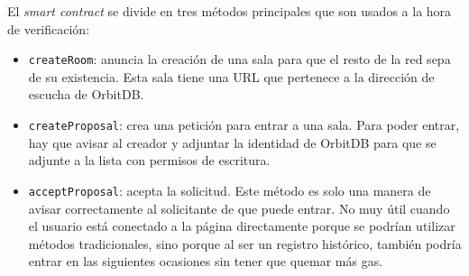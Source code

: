 El \textit{smart contract} se divide en tres métodos principales que son usados a la hora de verificación:
\begin{itemize}
    \item \verb|createRoom|: anuncia la creación de una sala para que el resto de la red sepa de su existencia.
    Esta sala tiene una URL que pertenece a la dirección de escucha de OrbitDB.
    \item \verb|createProposal|: crea una petición para entrar a una sala.
    Para poder entrar, hay que avisar al creador y adjuntar la identidad de OrbitDB para que se adjunte a la lista con permisos de escritura.
    \item \verb|acceptProposal|: acepta la solicitud. Este método es solo una manera de avisar correctamente al solicitante de que puede entrar. No muy útil cuando el usuario está conectado a la página directamente porque se podrían utilizar métodos tradicionales, sino porque al ser un registro histórico, también podría entrar en las siguientes ocasiones sin tener que quemar más gas.
\end{itemize}

